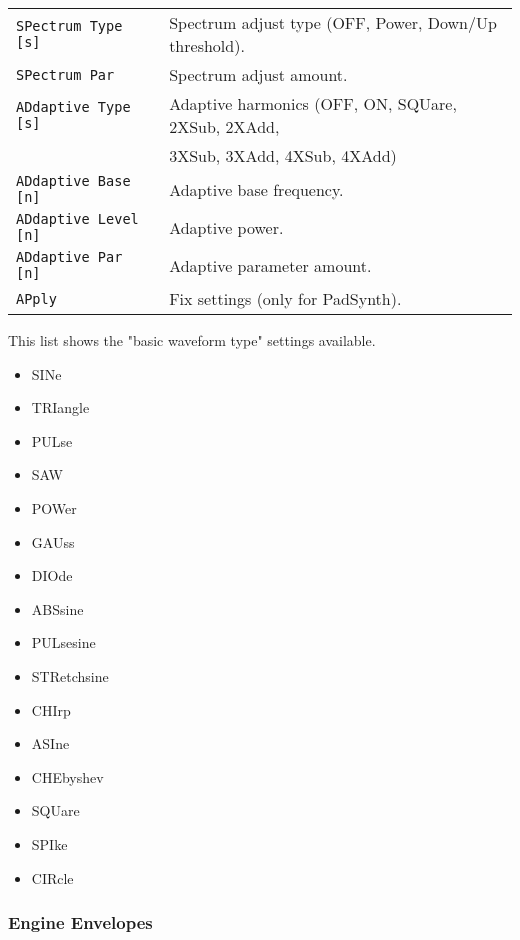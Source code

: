 \begin{table}[H]
\begin{tabular}{l l}
   \texttt{SPectrum Type [s]} &
       Spectrum adjust type (OFF, Power, Down/Up threshold). \\
   \texttt{SPectrum Par } &
      Spectrum adjust amount. \\
   \texttt{ADdaptive Type [s]} &
      Adaptive harmonics (OFF, ON, SQUare, 2XSub, 2XAdd, \\
   \texttt{} &
       3XSub, 3XAdd, 4XSub, 4XAdd) \\
   \texttt{ADdaptive Base [n]} &
      Adaptive base frequency. \\
   \texttt{ADdaptive Level [n]} &
      Adaptive power. \\
   \texttt{ADdaptive Par [n]} &
      Adaptive parameter amount. \\

   \texttt{APply} &
      Fix settings (only for PadSynth). \\

      \end{tabular}
   \end{table}

   This list shows the "basic waveform type" settings available.

   \begin{itemize}
      \item SINe
      \item TRIangle
      \item PULse
      \item SAW
      \item POWer
      \item GAUss
      \item DIOde
      \item ABSsine
      \item PULsesine
      \item STRetchsine
      \item CHIrp
      \item ASIne
      \item CHEbyshev
      \item SQUare
      \item SPIke
      \item CIRcle
   \end{itemize}

\subsubsection{Engine Envelopes}
\label{subsec:command_line_engine_envelopes}

